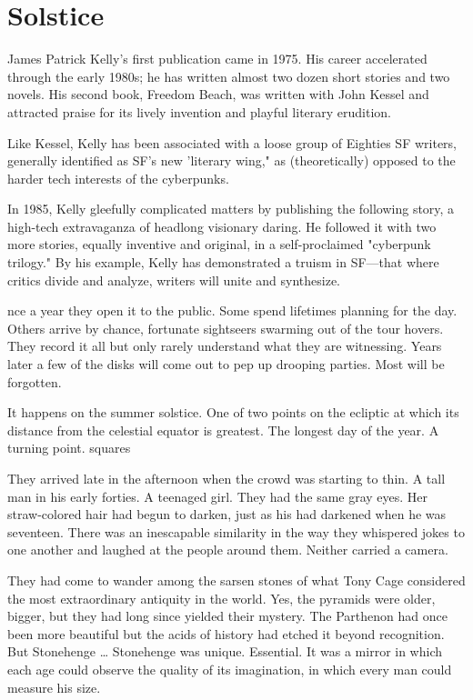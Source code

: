 \chapter{Solstice}

James Patrick Kelly's first publication came in 1975. His career accelerated through the early 1980s; he has written almost two dozen short stories and two novels. His second book, Freedom Beach, was written with John Kessel and attracted praise for its lively invention and playful literary erudition.

Like Kessel, Kelly has been associated with a loose group of Eighties SF writers, generally identified as SF's new 'literary wing," as (theoretically) opposed to the harder tech interests of the cyberpunks.

In 1985, Kelly gleefully complicated matters by publishing the following story, a high-tech extravaganza of headlong visionary daring. He followed it with two more stories, equally inventive and original, in a self-proclaimed "cyberpunk trilogy." By his example, Kelly has demonstrated a truism in SF—that where critics divide and analyze, writers will unite and synthesize.

\hrulefill

nce a year they open it to the public. Some spend lifetimes planning for the day. Others arrive by chance, fortunate sightseers swarming out of the tour hovers. They record it all but only rarely understand what they are witnessing. Years later a few of the disks will come out to pep up drooping parties. Most will be forgotten.

It happens on the summer solstice. One of two points on the ecliptic at which its distance from the celestial equator is greatest. The longest day of the year. A turning point.
squares

They arrived late in the afternoon when the crowd was starting to thin. A tall man in his early forties. A teenaged girl. They had the same gray eyes. Her straw-colored hair had begun to darken, just as his had darkened when he was seventeen. There was an inescapable similarity in the way they whispered jokes to one another and laughed at the people around them. Neither carried a camera.

They had come to wander among the sarsen stones of what Tony Cage considered the most extraordinary antiquity in the world. Yes, the pyramids were older, bigger, but they had long since yielded their mystery. The Parthenon had once been more beautiful but the acids of history had etched it beyond recognition. But Stonehenge … Stonehenge was unique. Essential. It was a mirror in which each age could observe the quality of its imagination, in which every man could measure his size.

